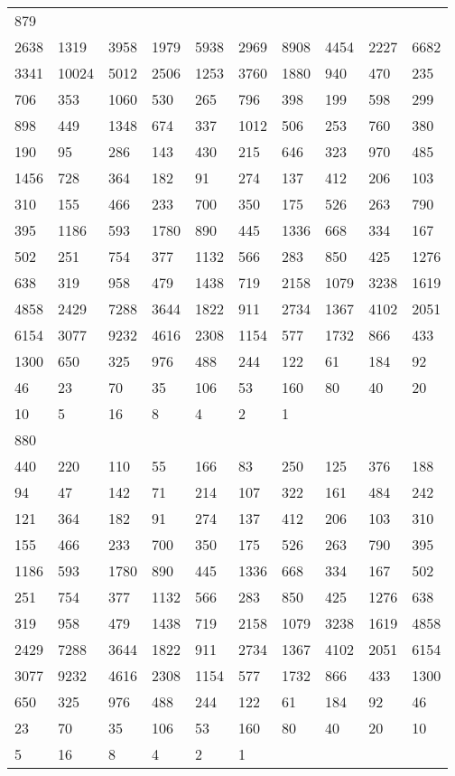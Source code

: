 \begin{longtable}{*{10}{l}}
879&&&&&&&&&\\
2638& 1319& 3958& 1979& 5938& 2969& 8908& 4454& 2227& 6682\\
3341& 10024& 5012& 2506& 1253& 3760& 1880& 940& 470& 235\\
706& 353& 1060& 530& 265& 796& 398& 199& 598& 299\\
898& 449& 1348& 674& 337& 1012& 506& 253& 760& 380\\
190& 95& 286& 143& 430& 215& 646& 323& 970& 485\\
1456& 728& 364& 182& 91& 274& 137& 412& 206& 103\\
310& 155& 466& 233& 700& 350& 175& 526& 263& 790\\
395& 1186& 593& 1780& 890& 445& 1336& 668& 334& 167\\
502& 251& 754& 377& 1132& 566& 283& 850& 425& 1276\\
638& 319& 958& 479& 1438& 719& 2158& 1079& 3238& 1619\\
4858& 2429& 7288& 3644& 1822& 911& 2734& 1367& 4102& 2051\\
6154& 3077& 9232& 4616& 2308& 1154& 577& 1732& 866& 433\\
1300& 650& 325& 976& 488& 244& 122& 61& 184& 92\\
46& 23& 70& 35& 106& 53& 160& 80& 40& 20\\
10& 5& 16& 8& 4& 2& 1& \\

880&&&&&&&&&\\
440& 220& 110& 55& 166& 83& 250& 125& 376& 188\\
94& 47& 142& 71& 214& 107& 322& 161& 484& 242\\
121& 364& 182& 91& 274& 137& 412& 206& 103& 310\\
155& 466& 233& 700& 350& 175& 526& 263& 790& 395\\
1186& 593& 1780& 890& 445& 1336& 668& 334& 167& 502\\
251& 754& 377& 1132& 566& 283& 850& 425& 1276& 638\\
319& 958& 479& 1438& 719& 2158& 1079& 3238& 1619& 4858\\
2429& 7288& 3644& 1822& 911& 2734& 1367& 4102& 2051& 6154\\
3077& 9232& 4616& 2308& 1154& 577& 1732& 866& 433& 1300\\
650& 325& 976& 488& 244& 122& 61& 184& 92& 46\\
23& 70& 35& 106& 53& 160& 80& 40& 20& 10\\
5& 16& 8& 4& 2& 1& \\


\end{longtable}
